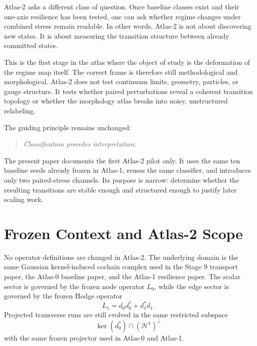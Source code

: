 \documentclass[11pt]{article}
\begin{document}
Atlas-2 asks a different class of question. Once baseline classes exist and their one-axis resilience has been tested, one can ask whether regime changes under combined stress remain readable. In other words, Atlas-2 is not about discovering new states. It is about measuring the transition structure between already committed states.

This is the first stage in the atlas where the object of study is the deformation of the regime map itself. The correct frame is therefore still methodological and morphological. Atlas-2 does not test continuum limits, geometry, particles, or gauge structure. It tests whether paired perturbations reveal a coherent transition topology or whether the morphology atlas breaks into noisy, unstructured relabeling.

The guiding principle remains unchanged:
\begin{quote}
\emph{Classification precedes interpretation.}
\end{quote}

The present paper documents the first Atlas-2 pilot only. It uses the same ten baseline seeds already frozen in Atlas-1, reuses the same classifier, and introduces only two paired-stress channels. Its purpose is narrow: determine whether the resulting transitions are stable enough and structured enough to justify later scaling work.

\section{Frozen Context and Atlas-2 Scope}
No operator definitions are changed in Atlas-2. The underlying domain is the same Gaussian kernel-induced cochain complex used in the Stage 9 transport paper, the Atlas-0 baseline paper, and the Atlas-1 resilience paper. The scalar sector is governed by the frozen node operator $L_0$, while the edge sector is governed by the frozen Hodge operator
\begin{equation}
L_1 = d_0 d_0^{*} + d_1^{*} d_1.
\end{equation}
Projected transverse runs are still evolved in the same restricted subspace
\begin{equation}
\ker(d_0^{*}) \cap (\mathcal{H}^1)^\perp
\end{equation}
with the same frozen projector used in Atlas-0 and Atlas-1.
\end{document}
